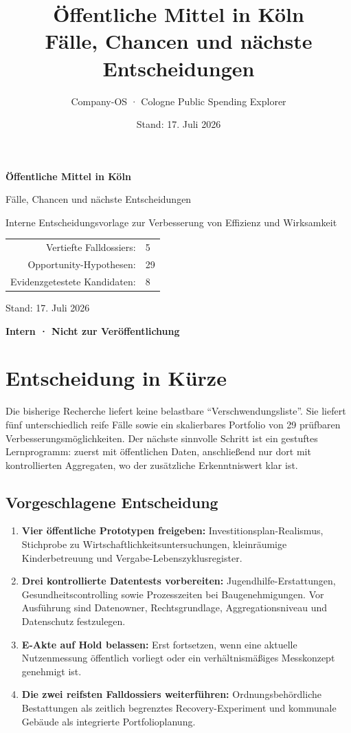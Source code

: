 \documentclass[11pt,a4paper]{article}
\title{\textbf{Öffentliche Mittel in Köln}\\[0.4em]
\large Fälle, Chancen und nächste Entscheidungen}
\author{Company-OS · Cologne Public Spending Explorer}
\date{Stand: 17. Juli 2026}
\begin{document}
\begin{titlepage}
  \centering
  \vspace*{3cm}
  {\Huge\bfseries Öffentliche Mittel in Köln\par}
  \vspace{0.8cm}
  {\LARGE Fälle, Chancen und nächste Entscheidungen\par}
  \vspace{1.5cm}
  {\large Interne Entscheidungsvorlage zur Verbesserung von Effizienz und Wirksamkeit\par}
  \vfill
  \begin{tabular}{rl}
    Vertiefte Falldossiers: & 5 \\
    Opportunity-Hypothesen: & 29 \\
    Evidenzgetestete Kandidaten: & 8 \\
  \end{tabular}
  \vfill
  {\large Stand: 17. Juli 2026\par}
  \vspace{0.5cm}
  {\bfseries Intern · Nicht zur Veröffentlichung\par}
\end{titlepage}

\tableofcontents
\clearpage

\section{Entscheidung in Kürze}

Die bisherige Recherche liefert keine belastbare ``Verschwendungsliste''. Sie liefert fünf unterschiedlich reife Fälle sowie ein skalierbares Portfolio von 29 prüfbaren Verbesserungsmöglichkeiten. Der nächste sinnvolle Schritt ist ein gestuftes Lernprogramm: zuerst mit öffentlichen Daten, anschließend nur dort mit kontrollierten Aggregaten, wo der zusätzliche Erkenntniswert klar ist.

\subsection{Vorgeschlagene Entscheidung}

\begin{enumerate}
  \item \textbf{Vier öffentliche Prototypen freigeben:} Investitionsplan-Realismus, Stichprobe zu Wirtschaftlichkeitsuntersuchungen, kleinräumige Kinderbetreuung und Vergabe-Lebenszyklusregister.
  \item \textbf{Drei kontrollierte Datentests vorbereiten:} Jugendhilfe-Erstattungen, Gesundheitscontrolling sowie Prozesszeiten bei Baugenehmigungen. Vor Ausführung sind Datenowner, Rechtsgrundlage, Aggregationsniveau und Datenschutz festzulegen.
  \item \textbf{E-Akte auf Hold belassen:} Erst fortsetzen, wenn eine aktuelle Nutzenmessung öffentlich vorliegt oder ein verhältnismäßiges Messkonzept genehmigt ist.
  \item \textbf{Die zwei reifsten Falldossiers weiterführen:} Ordnungsbehördliche Bestattungen als zeitlich begrenztes Recovery-Experiment und kommunale Gebäude als integrierte Portfolioplanung.
\end{enumerate}
\end{document}
